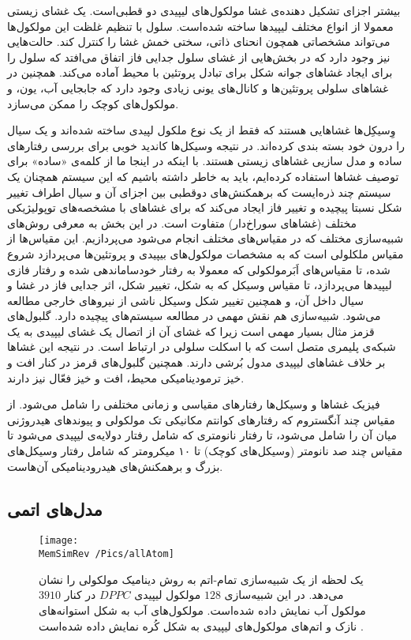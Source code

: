 بیشتر اجزای تشکیل دهنده‌ی غشا مولکول‌های لیپیدی دو قطبی‌است. یک غشای زیستی معمولا از انواع مختلف لیپید‌ها ساخته شده‌است. سلول با تنظیم غلظت این مولکول‌ها می‌تواند مشخصاتی همچون انحنای ذاتی، سختی خمش غشا را کنترل کند. حالت‌هایی نیز وجود دارد که در بخش‌هایی از غشای سلول جدایی فاز اتفاق می‌افتد که سلول را برای ایجاد غشاهای جوانه شکل برای تبادل پروتئین با محیط آماده می‌کند. همچنین در غشاهای سلولی پروتئین‌ها و کانال‌های یونی زیادی وجود دارد که جابجایی آب، یون، و مولکول‌های کوچک را ممکن می‌سازد.


وِسیکِل‌ها
 غشاهایی هستند که فقط از یک نوع ملکول‌ لپیدی ساخته ‌شده‌اند و یک سیال را درون خود بسته بندی کرده‌اند. در نتیجه وسیکل‌ها کاندید خوبی برای بررسی رفتارهای ساده‌ و مدل سازیی غشاهای زیستی هستند. با اینکه در اینجا ما از کلمه‌ی «ساده» برای توصیف غشاها استفاده کرده‌ایم، باید به خاطر داشته باشیم که این سیستم همچنان یک سیستم چند ذره‌ایست که برهمکنش‌های دوقطبی بین اجزای آن و سیال اطراف تغییر شکل‌  نسبتا پیچیده‌ و تغییر فاز ایجاد می‌کند که برای غشاهای با مشخصه‌های توپولیژیکی مختلف (غشاهای سوراخ‌دار) متفاوت است. در این بخش به معرفی روش‌های شبیه‌سازی مختلف که در مقیاس‌های مختلف انجام می‌شود می‌پردازیم. این مقیاس‌ها از مقیاس ملکلولی است که به مشخصات مولکول‌های بیپیدی و پروتئین‌ها می‌پردازد شروع شده، تا مقیاس‌های اَبَرمولکولی
 که معمولا به رفتار خودساماندهی شده و رفتار فازی لیپید‌ها می‌پردازد، تا مقیاس وسیکل که به شکل، تغییر شکل، اثر جدایی فاز در غشا و سیال داخل آن، و همچنین تغییر شکل وسیکل ناشی از نیروهای خارجی مطالعه می‌شود. شبیه‌سازی هم نقش مهمی در مطالعه سیستم‌های پیچیده دارد. گلبول‌های قزمز مثال بسیار مهمی‌ است زیرا که غشای آن از اتصال یک غشای لیپیدی به یک شبکه‌ی پلیمری متصل است که با اسکلت سلولی در ارتباط است. در نتیجه این غشاها بر خلاف غشاهای لیپیدی مدول بُرشی
 دارند. همچنین گلبول‌های قرمز در کنار افت و خیز ترمودینامیکی محیط، افت و خیز فعّال نیز دارند.
 
 
 فیزیک غشا‌ها و وسیکل‌ها رفتار‌های مقیاسی و زمانی مختلفی را شامل می‌شود. از مقیاس چند آنگستروم که رفتارهای کوانتم مکانیکی تک مولکولی و پیوندهای هیدروژنی میان آن را شامل می‌شود، تا رفتار نانومتری که شامل رفتار دولایه‌ی لیپیدی می‌شود تا مقیاس چند صد نانومتر (وسیکل‌های کوچک) تا ۱۰ میکرومتر که شامل رفتار وسیکل‌های بزرگ و برهمکنش‌های هیدرودینامیکی آن‌هاست.
 
 
 \subsection{
 مدل‌های اتمی
 }
 
\begin{figure}[h]
\begin{center}
\texttt{[image: \\MemSimRev /Pics/allAtom]}
\caption{
یک لحظه از یک شبیه‌سازی تمام-اتم به روش دینامیک مولکولی را نشان می‌دهد. در این شبیه‌سازی
$128$
مولکول لیپیدی
$DPPC$
در کنار
$3910$
مولکول آب نمایش داده شده‌است. مولکول‌های آب به شکل استوانه‌های نازک و اتم‌های مولکول‌های لیپیدی به شکل کُره‌ نمایش داده شده‌است
\cite{Tieleman1997}.
}
\label{fig:allAtom}
\end{center}
\end{figure}


